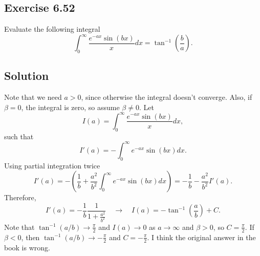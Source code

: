 \subsection*{Exercise 6.52}

Evaluate the following integral
\begin{equation*}
    \int_0^{\infty} \frac{e^{-a x} \sin(bx)}{x} dx = \tan^{-1} \left(\frac{b}{a}\right).
\end{equation*}

\subsection*{Solution}
Note that we need $a > 0$, since otherwise the integral doesn't converge.
Also, if $\beta = 0$, the integral is zero, so assume $\beta \neq 0$.
Let
\begin{equation*}
    I(a) = \int_0^{\infty} \frac{e^{-a x} \sin(bx)}{x} dx,
\end{equation*}
such that
\begin{equation*}
    I'(a) = - \int_0^{\infty} e^{-ax} \sin(b x) dx.
\end{equation*}
Using partial integration twice
\begin{equation*}
    I'(a) = -\left( \frac{1}{b} + \frac{a^2}{b^2} \int_0^{\infty} e^{-ax} \sin(bx) dx\right)
        = -\frac{1}{b} - \frac{a^2}{b^2} I'(a).
\end{equation*}
Therefore,
\begin{equation*}
    I'(a) = -\frac{1}{b} \frac{1}{1 + \frac{a^2}{b^2}}
        \quad \rightarrow \quad I(a) = -\tan^{-1}\left(\frac{a}{b}\right) + C.
\end{equation*}
Note that $\tan^{-1}(a/b) \to \frac{\pi}{2}$ and $I(a) \to 0$ as $a \to \infty$ and $\beta > 0$, so $C = \frac{\pi}{2}$.
If $\beta < 0$, then $\tan^{-1}(a/b) \to -\frac{\pi}{2}$ and $C = -\frac{\pi}{2}$.
I think the original answer in the book is wrong.

